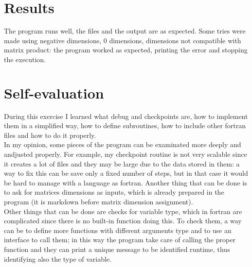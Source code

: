\documentclass[12pt, a4paper, notitlepage]{report}
\begin{document}
\section*{Results}
The program runs well, the files and the output are as expected.
Some tries were made using negative dimensions, 0 dimensions, dimensions not compatible with matrix product: the program worked as expected, printing the error and stopping the execution.

\section*{Self-evaluation}
During this exercise I learned what debug and checkpoints are, how to implement them in a simplified way, how to define subroutines, how to include other fortran files and how to do it properly.\\
In my opinion, some pieces of the program can be examinated more deeply and andjusted properly. For example, my checkpoint routine is not very scalable since it creates a lot of files and they may be large due to the data stored in them: a way to fix this can be save only a fixed number of steps, but in that case it would be hard to manage with a language as fortran. Another thing that can be done is to ask for matrices dimensions as inputs, which is already prepared in the program (it is markdown before matrix dimension assignment).\\
Other things that can be done are checks for variable type, which in fortran are complicated since there is no built-in function doing this. To check them, a way can be to define more functions with different arguments type and to use an interface to call them; in this way the program take care of calling the proper function and they can print a unique message to be identified runtime, thus identifying also the type of variable.\\
\end{document}
